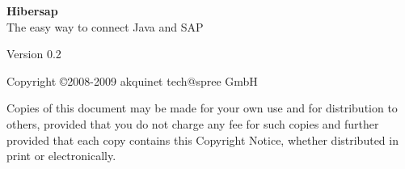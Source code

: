 \begin{titlepage}
	 \HRule 
	\begin{flushleft} 
		\Huge {\bf Hibersap} \\
		\LARGE The easy way to connect Java and SAP \\
	\end{flushleft}
	\HRule {} 
	\begin{center} 
		\large Version 0.2 
	\end{center}
	\begin{center}
		\large Copyright \copyright 2008-2009 akquinet tech@spree GmbH 
	\end{center}
	\begin{center} 
		Copies of this document may be made for your own use and for distribution to others, 
		provided that you do not charge any fee for such copies and further provided that each 
		copy contains this Copyright Notice, whether distributed in print or
		electronically.
	\end{center}
\end{titlepage}
